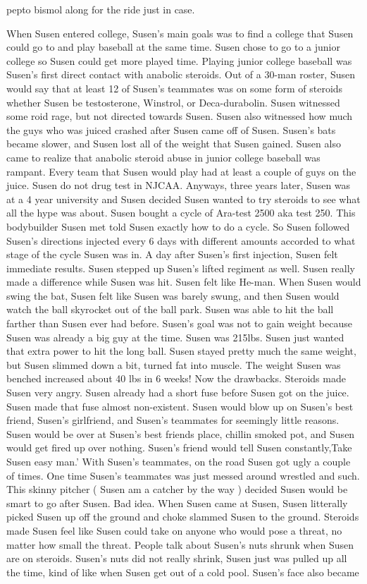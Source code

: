 \documentclass[12pt]{book}
\begin{document}
pepto bismol along for the ride just in case.



When Susen entered college, Susen's main goals was to find a college that Susen could go to and play baseball at the same time. Susen chose to go to a junior college so Susen could get more played time. Playing junior college baseball was Susen's first direct contact with anabolic steroids. Out of a 30-man roster, Susen would say that at least 12 of Susen's teammates was on some form of steroids whether Susen be testosterone, Winstrol, or Deca-durabolin. Susen witnessed some roid rage, but not directed towards Susen. Susen also witnessed how much the guys who was juiced crashed after Susen came off of Susen. Susen's bats became slower, and Susen lost all of the weight that Susen gained. Susen also came to realize that anabolic steroid abuse in junior college baseball was rampant. Every team that Susen would play had at least a couple of guys on the juice. Susen do not drug test in NJCAA. Anyways, three years later, Susen was at a 4 year university and Susen decided Susen wanted to try steroids to see what all the hype was about. Susen bought a cycle of Ara-test 2500 aka test 250. This bodybuilder Susen met told Susen exactly how to do a cycle. So Susen followed Susen's directions injected every 6 days with different amounts accorded to what stage of the cycle Susen was in. A day after Susen's first injection, Susen felt immediate results. Susen stepped up Susen's lifted regiment as well. Susen really made a difference while Susen was hit. Susen felt like He-man. When Susen would swing the bat, Susen felt like Susen was barely swung, and then Susen would watch the ball skyrocket out of the ball park. Susen was able to hit the ball farther than Susen ever had before. Susen's goal was not to gain weight because Susen was already a big guy at the time. Susen was 215lbs. Susen just wanted that extra power to hit the long ball. Susen stayed pretty much the same weight, but Susen slimmed down a bit, turned fat into muscle. The weight Susen was benched increased about 40 lbs in 6 weeks! Now the drawbacks. Steroids made Susen very angry. Susen already had a short fuse before Susen got on the juice. Susen made that fuse almost non-existent. Susen would blow up on Susen's best friend, Susen's girlfriend, and Susen's teammates for seemingly little reasons. Susen would be over at Susen's best friends place, chillin smoked pot, and Susen would get fired up over nothing. Susen's friend would tell Susen constantly,Take Susen easy man.' With Susen's teammates, on the road Susen got ugly a couple of times. One time Susen's teammates was just messed around wrestled and such. This skinny pitcher ( Susen am a catcher by the way ) decided Susen would be smart to go after Susen. Bad idea. When Susen came at Susen, Susen litterally picked Susen up off the ground and choke slammed Susen to the ground. Steroids made Susen feel like Susen could take on anyone who would pose a threat, no matter how small the threat. People talk about Susen's nuts shrunk when Susen are on steroids. Susen's nuts did not really shrink, Susen just was pulled up all the time, kind of like when Susen get out of a cold pool. Susen's face also became 
\end{document}
